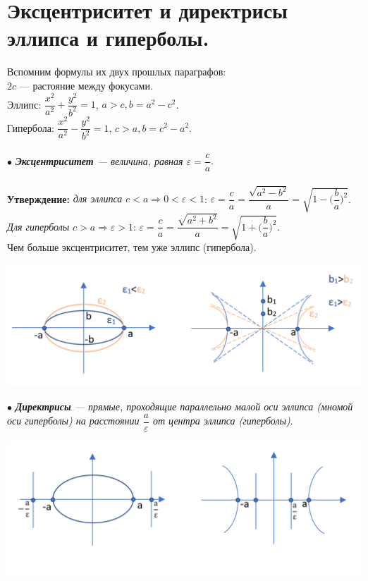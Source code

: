 \documentclass[a4paper, 12pt]{report}
\begin{document}
\section{Эксцентриситет и директрисы эллипса и гиперболы.}

Вспомним формулы их двух прошлых параграфов:\\
$2c$ --- растояние между фокусами.\\
Эллипс: $\dfrac{x^2}{a^2} + \dfrac{y^2}{b^2} = 1$, $a > c, b = a^2 - c^2$.\\
Гипербола: $\dfrac{x^2}{a^2} - \dfrac{y^2}{b^2} = 1$, $c > a, b = c^2 - a^2$.\\\\
$\bullet$ \textit{\textbf{Эксцентриситет} --- величина, равная $\varepsilon = \dfrac{c}{a}$}.\\\\
\textbf{Утверждение:} \textit{для эллипса $c < a \Rightarrow 0 < \varepsilon < 1$}: $\varepsilon = \dfrac{c}{a} = \dfrac{\sqrt{a^2 - b^2}}{a} = \sqrt{1 - \Big(\dfrac{b}{a}\Big)^2}$. \textit{Для гиперболы} $c > a \Rightarrow \varepsilon > 1$: $\varepsilon = \dfrac{c}{a} = \dfrac{\sqrt{a^2+b^2}}{a} = \sqrt{1 + \Big(\dfrac{b}{a}\Big)^2}$.\\ Чем больше эксцентриситет, тем уже эллипс (гипербола).
\begin{center}
	\includegraphics[width=1\textwidth]{Эксцентриситет_1.PNG}
\end{center}
$\bullet$ \textit{\textbf{Директрисы} --- прямые, проходящие параллельно малой оси эллипса (мномой оси гиперболы) на расстоянии $\dfrac{a}{\varepsilon}$ от центра эллипса (гиперболы)}.
\begin{center}
	\includegraphics[width=1\textwidth]{Эксцентриситет_2.PNG}
\end{center}
\end{document}

